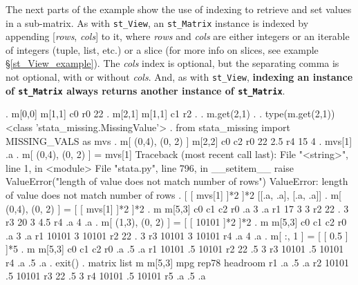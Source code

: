 \documentclass{article}
\begin{document}
The next parts of the example show the use of indexing to retrieve and set values in a sub-matrix. As with \lstinline{st_View}, an \lstinline{st_Matrix} instance is indexed by appending [\textit{rows}, \textit{cols}] to it, where \textit{rows} and \textit{cols} are either integers or an iterable of integers (tuple, list, etc.) or a slice (for more info on slices, see example \S\ref{st_View_example}). The \textit{cols} index is optional, but the separating comma is not optional, with or without \textit{cols}. And, as with \lstinline{st_View}, \textbf{indexing an instance of \lstinline{st_Matrix} always returns another instance of \lstinline{st_Matrix}}.
\begin{stlog}
{\smallskip}
. m[0,0]
{\smallskip}
m[1,1]
           c0
r0         22
{\smallskip}
. m[2,1]
{\smallskip}
m[1,1]
           c1
r2          .
{\smallskip}
. m.get(2,1)
.
{\smallskip}
. type(m.get(2,1))
<class 'stata_missing.MissingValue'>
{\smallskip}
. from stata_missing import MISSING_VALS as mvs
{\smallskip}
. m[ (0,4), (0, 2) ]
{\smallskip}
m[2,2]
           c0         c2
r0         22        2.5
r4         15          4
{\smallskip}
. mvs[1]
.a
{\smallskip}
. m[ (0,4), (0, 2) ] = mvs[1]
{\color{red}Traceback (most recent call last):
  File "<string>", line 1, in <module>
  File "stata.py", line 796, in __setitem__
    raise ValueError("length of value does not match number of rows")
ValueError: length of value does not match number of rows}
{\smallskip}
. [ [ mvs[1] ]*2 ]*2
[[.a, .a], [.a, .a]]
{\smallskip}
. m[ (0,4), (0, 2) ] = [ [ mvs[1] ]*2 ]*2
{\smallskip}
. m
{\smallskip}
m[5,3]
           c0         c1         c2
r0         .a          3         .a
r1         17          3          3
r2         22          .          3
r3         20          3        4.5
r4         .a          4         .a
{\smallskip}
. m[ (1,3), (0, 2) ] = [ [ 10101 ]*2 ]*2
{\smallskip}
. m
{\smallskip}
m[5,3]
           c0         c1         c2
r0         .a          3         .a
r1      10101          3      10101
r2         22          .          3
r3      10101          3      10101
r4         .a          4         .a
{\smallskip}
. m[ :, 1 ] = [ [ 0.5 ] ]*5
{\smallskip}
. m
{\smallskip}
m[5,3]
           c0         c1         c2
r0         .a         .5         .a
r1      10101         .5      10101
r2         22         .5          3
r3      10101         .5      10101
r4         .a         .5         .a
{\smallskip}
. exit()
{\smallskip}
. matrix list m
{\smallskip}
m[5,3]
         mpg     rep78  headroom
r1        .a        .5        .a
r2     10101        .5     10101
r3        22        .5         3
r4     10101        .5     10101
r5        .a        .5        .a
{\smallskip}
\end{stlog}
\end{document}
